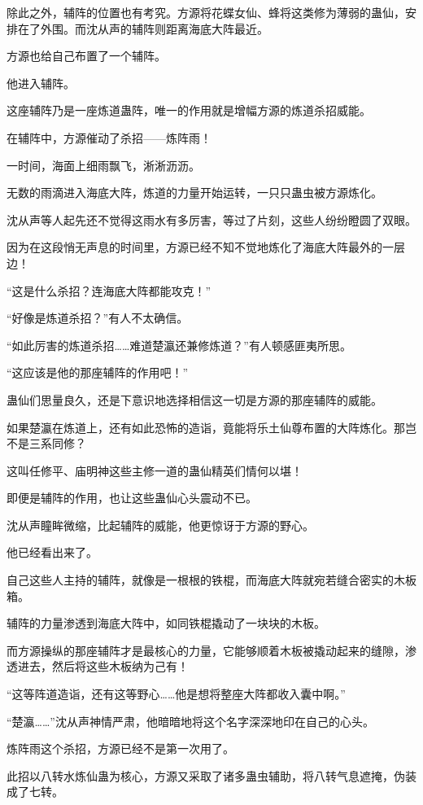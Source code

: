 \begin{this_body}
除此之外，辅阵的位置也有考究。方源将花蝶女仙、蜂将这类修为薄弱的蛊仙，安排在了外围。而沈从声的辅阵则距离海底大阵最近。

方源也给自己布置了一个辅阵。

他进入辅阵。

这座辅阵乃是一座炼道蛊阵，唯一的作用就是增幅方源的炼道杀招威能。

在辅阵中，方源催动了杀招——炼阵雨！

一时间，海面上细雨飘飞，淅淅沥沥。

无数的雨滴进入海底大阵，炼道的力量开始运转，一只只蛊虫被方源炼化。

沈从声等人起先还不觉得这雨水有多厉害，等过了片刻，这些人纷纷瞪圆了双眼。

因为在这段悄无声息的时间里，方源已经不知不觉地炼化了海底大阵最外的一层边！

“这是什么杀招？连海底大阵都能攻克！”

“好像是炼道杀招？”有人不太确信。

“如此厉害的炼道杀招……难道楚瀛还兼修炼道？”有人顿感匪夷所思。

“这应该是他的那座辅阵的作用吧！”

蛊仙们思量良久，还是下意识地选择相信这一切是方源的那座辅阵的威能。

如果楚瀛在炼道上，还有如此恐怖的造诣，竟能将乐土仙尊布置的大阵炼化。那岂不是三系同修？

这叫任修平、庙明神这些主修一道的蛊仙精英们情何以堪！

即便是辅阵的作用，也让这些蛊仙心头震动不已。

沈从声瞳眸微缩，比起辅阵的威能，他更惊讶于方源的野心。

他已经看出来了。

自己这些人主持的辅阵，就像是一根根的铁棍，而海底大阵就宛若缝合密实的木板箱。

辅阵的力量渗透到海底大阵中，如同铁棍撬动了一块块的木板。

而方源操纵的那座辅阵才是最核心的力量，它能够顺着木板被撬动起来的缝隙，渗透进去，然后将这些木板纳为己有！

“这等阵道造诣，还有这等野心……他是想将整座大阵都收入囊中啊。”

“楚瀛……”沈从声神情严肃，他暗暗地将这个名字深深地印在自己的心头。

炼阵雨这个杀招，方源已经不是第一次用了。

此招以八转水炼仙蛊为核心，方源又采取了诸多蛊虫辅助，将八转气息遮掩，伪装成了七转。


\end{this_body}

